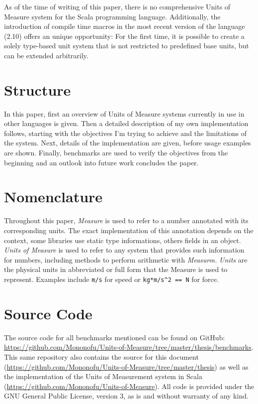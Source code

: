 \documentclass[12pt,oneside,a4paper]{scrbook}
\begin{document}
As of the time of writing of this paper, there is no comprehensive Units of Measure system for the Scala programming language. Additionally, the introduction of compile time macros in the most recent version of the language (2.10) offers an unique opportunity: For the first time, it is possible to create a solely type-based unit system that is not restricted to predefined base units, but can be extended arbitrarily.


\section{Structure}
In this paper, first an overview of Units of Measure systems currently in use in other languages is given. Then a detailed description of my own implementation follows, starting with the objectives I'm trying to achieve and the limitations of the system. Next, details of the implementation are given, before usage examples are shown. Finally, benchmarks are used to verify the objectives from the beginning and an outlook into future work concludes the paper.


\section{Nomenclature}
Throughout this paper, \emph{Measure} is used to refer to a number annotated with its corresponding units. The exact implementation of this annotation depends on the context, some libraries use static type informations, others fields in an object. \emph{Units of Measure} is used to refer to any system that provides such information for numbers, including methods to perform arithmetic with \emph{Measure}s. \emph{Units} are the physical units in abbreviated or full form that the Measure is used to represent. Examples include \verb|m/s| for speed or \verb|kg*m/s^2 == N| for force.


\section{Source Code}
The source code for all benchmarks mentioned can be found on GitHub: \url{https://github.com/Mononofu/Units-of-Measure/tree/master/thesis/benchmarks}. This same repository also contains the source for this document (\url{https://github.com/Mononofu/Units-of-Measure/tree/master/thesis}) as well as the implementation of the Units of Measurement system in Scala (\url{https://github.com/Mononofu/Units-of-Measure}). All code is provided under the GNU General Public License, version 3, as is and without warranty of any kind.
\end{document}
